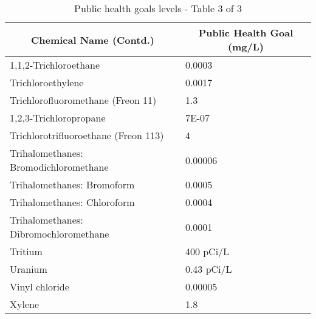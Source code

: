 \newpage
\FloatBarrier
\begin{table}[!htbp]
\begin{tabular}{|m{9cm}|m{5cm}|}
\hline
\multicolumn{1}{|c|}{\textbf{Chemical Name (Contd.)}}                        & \multicolumn{1}{c|}{\textbf{Public Health Goal (mg/L)}} \\ \hline

1,1,2-Trichloroethane                                               & 0.0003                                                  \\ \hline
Trichloroethylene                                                   & 0.0017                                                  \\ \hline
Trichlorofluoromethane (Freon 11)                                   & 1.3                                                     \\ \hline
1,2,3-Trichloropropane                                              & 7E-07                                                   \\ \hline

Trichlorotrifluoroethane (Freon 113)                                & 4                                                       \\ \hline
Trihalomethanes: Bromodichloromethane                               & 0.00006                                                 \\ \hline
Trihalomethanes: Bromoform                                          & 0.0005                                                  \\ \hline
Trihalomethanes: Chloroform                                         & 0.0004                                                  \\ \hline
Trihalomethanes: Dibromochloromethane                               & 0.0001                                                  \\ \hline
Tritium                                                             & 400 pCi/L                                               \\ \hline
Uranium                                                             & 0.43 pCi/L                                              \\ \hline
Vinyl chloride                                                      & 0.00005                                                 \\ \hline
Xylene                                                              & 1.8                                                     \\ \hline
\end{tabular}
\caption{Public health goals levels - Table 3 of 3}
\label{table:PHG3}
\end{table}
\newpage


